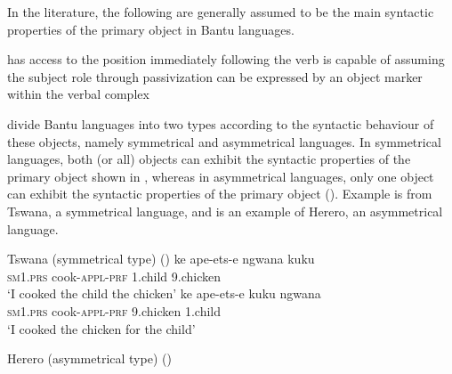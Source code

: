 \documentclass[output=paper,
            colorlinks, citecolor=brown
            ,draftmode
		  ]{langscibook}
\begin{document}
In the literature, the following are generally assumed to be the main syntactic properties of the primary object in Bantu languages. 



\ea \citet[220]{HymanDuranti1982}
    \label{ex:yoneda:4}
    \ea\label{ex:yoneda:4a} has access to the position immediately following the verb
    \ex\label{ex:yoneda:4b} is capable of assuming the subject role through passivization
    \ex\label{ex:yoneda:4c} can be expressed by an object marker within the verbal complex
    \z
\z


\citet{BresnanMoshi1993} divide Bantu languages into two types according to the syntactic behaviour of these objects, namely symmetrical and asymmetrical languages. In symmetrical languages, both (or all) objects can exhibit the syntactic properties of the primary object shown in , whereas in asymmetrical languages, only one object can exhibit the syntactic properties of the primary object (\citealt[47]{BresnanMoshi1993}). Example  is from Tswana, a symmetrical language, and  is an example of Herero, an asymmetrical language.


\ea Tswana (symmetrical type)    (\citealt[269]{MartenEtAl2007})
    \label{ex:yoneda:5}
    \ea\label{ex:yoneda:5a} \gll ke         ape-ets-e           ngwana     kuku\\
         \textsc{sm1.prs}   cook{}-\textsc{appl-prf}     1.child     9.chicken\\
    \glt ‘I cooked the child the chicken’
    \ex\label{ex:yoneda:5b} \gll ke         ape-ets-e           kuku       ngwana\\
    \textsc{sm1.prs}  cook{}-\textsc{appl-prf}     9.chicken   1.child\\
    \glt ‘I cooked the chicken for the child’
    \z

\newpage
\ex Herero (asymmetrical type)  (\citealt[269]{MartenEtAl2007})
    \label{ex:yoneda:6}
    \z
\z
\end{document}
